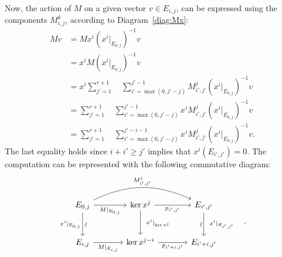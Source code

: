 \documentclass[english]{article}
\begin{document}
Now, the action of $M$ on a given vector $v\in E_{i,j}$, can be expressed using the components $M^k_{i,j}$, according to Diagram~\eqref{diag:Mx}:
\[\begin{aligned}
    M v
    &= Mx^i \left( x^i|_{E_{0,j}} \right)^{-1} v\\
    &= x^i M \left( x^i|_{E_{0,j}} \right)^{-1} v\\
    &= x^i \sum_{j'=1}^{r+1} \quad \sum_{i'=\max(0, j'-j)}^{j'-1}
           M^j_{i',j'} \left( x^i|_{E_{0,j}} \right)^{-1} v\\
    &= \sum_{j'=1}^{r+1} \quad \sum_{i'=\max(0, j'-j)}^{j'-1}
            x^i M^j_{i', j'} \left( x^i|_{E_{0,j}} \right)^{-1} v\\
    &= \sum_{j'=1}^{r+1} \quad \sum_{i'=\max(0, j'-j)}^{j'-i - 1}
    x^i M^j_{i', j'} \left( x^i|_{E_{0,j}} \right)^{-1} v
.\end{aligned}
\]
The last equality holds since $i+i' \geqslant j'$ implies that $x^i (E_{i',j'}) = 0$. The computation can be represented with the following commutative diagram:
\begin{equation}\label{diag:Mkij}
%
\begin{tikzcd}[sep = large]
    E_{0,j}
        \ar[d, "x^i|_{E_{0,j}}"', "\sim" sloped]
        \ar[r, "M|_{E_{0,j}}"']
        \ar[rr, "M^j_{i',j'}", bend left=25]
&
    \ker x^j
        \ar[d, "x^{i}|_{\ker x^{j}}" outer sep=5pt]
        \ar[r, "p_{i',j'}"']
&
    E_{i',j'}
        \ar[d, "x^{i}|_{E_{i',j'}}" outer sep=5pt, "\sim"' sloped]
\\
    E_{i,j}
        \ar[r, "M|_{E_{i,j}}"']
&
    \ker x^{j-i}
        \ar[r, "p_{i'+i,j'}"']
&
    E_{i'+i,j'}
\end{tikzcd}\quad.
\end{equation}
\end{document}
